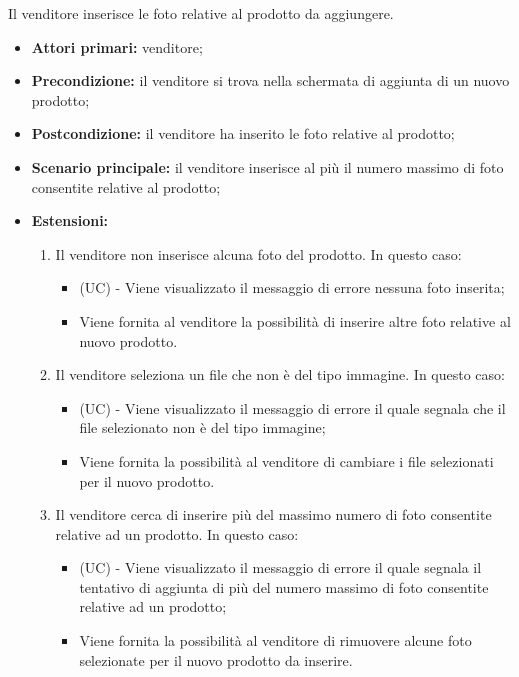 Il venditore inserisce le foto relative al prodotto da aggiungere.
\begin{itemize}
    \item \textbf{Attori primari:} venditore;
    \item \textbf{Precondizione:} il venditore si trova nella schermata di aggiunta di un nuovo prodotto;
    \item \textbf{Postcondizione:} il venditore ha inserito le foto relative al prodotto;
    \item \textbf{Scenario principale:} il venditore inserisce al più il numero massimo di foto consentite relative al prodotto;
    \item \textbf{Estensioni:}
    \begin{enumerate}[label=\lett]
    	\item Il venditore non inserisce alcuna foto del prodotto. In questo caso:
    	\begin{itemize}
    		\item (UC) - Viene visualizzato il messaggio di errore nessuna foto inserita;
    		\item Viene fornita al venditore la possibilità di inserire altre foto relative al nuovo prodotto.
    	\end{itemize}
    	\item Il venditore seleziona un file che non è del tipo immagine. In questo caso:
    	\begin{itemize}
    		\item (UC) - Viene visualizzato il messaggio di errore il quale segnala che il file selezionato non è del tipo immagine;
    		\item Viene fornita la possibilità al venditore di cambiare i file selezionati per il nuovo prodotto.
    	\end{itemize}
    	\item Il venditore cerca di inserire più del massimo numero di foto consentite relative ad un prodotto. In questo caso:
    	\begin{itemize}
    		\item (UC) - Viene visualizzato il messaggio di errore il quale segnala il tentativo di aggiunta di più del numero massimo di foto consentite relative ad un prodotto;
    		\item Viene fornita la possibilità al venditore di rimuovere alcune foto selezionate per il nuovo prodotto da inserire.
    	\end{itemize}
    \end{enumerate}
\end{itemize}

